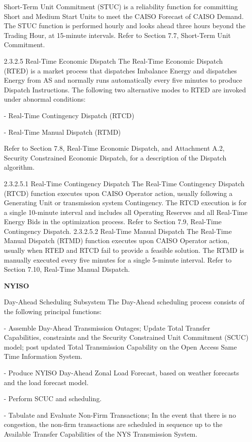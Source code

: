 \documentclass[11pt,a4paper]{article}
\begin{document}
Short-Term Unit Commitment (STUC) is a reliability function for committing Short and Medium Start Units to meet the CAISO Forecast of CAISO Demand. The STUC function is performed hourly and looks ahead three hours beyond the Trading Hour, at 15-minute intervals. Refer to Section 7.7, Short-Term Unit Commitment.

2.3.2.5 Real-Time Economic Dispatch
The Real-Time Economic Dispatch (RTED) is a market process that dispatches Imbalance Energy and dispatches Energy from AS and normally runs automatically every five minutes to
produce Dispatch Instructions. The following two alternative modes to RTED are invoked under abnormal conditions:

- Real-Time Contingency Dispatch (RTCD)

- Real-Time Manual Dispatch (RTMD)

Refer to Section 7.8, Real-Time Economic Dispatch, and Attachment A.2, Security Constrained Economic Dispatch, for a description of the Dispatch algorithm.

2.3.2.5.1 Real-Time Contingency Dispatch
The Real-Time Contingency Dispatch (RTCD) function executes upon CAISO Operator action, usually following a Generating Unit or transmission system Contingency. The RTCD execution is for a single 10-minute interval and includes all Operating Reserves and all Real-Time Energy Bids in the optimization process. Refer to Section 7.9, Real-Time Contingency Dispatch.
2.3.2.5.2 Real-Time Manual Dispatch
The Real-Time Manual Dispatch (RTMD) function executes upon CAISO Operator action, usually when RTED and RTCD fail to provide a feasible solution. The RTMD is manually executed every five minutes for a single 5-minute interval. Refer to Section 7.10, Real-Time Manual Dispatch.


\textbf{NYISO}

Day-Ahead Scheduling Subsystem
The Day-Ahead scheduling process consists of the following principal functions:

- Assemble Day-Ahead Transmission Outages; Update Total Transfer Capabilities, constraints and the Security Constrained Unit Commitment (SCUC) model; post updated Total Transmission Capability on the Open Access Same Time Information System.

- Produce NYISO Day-Ahead Zonal Load Forecast, based on weather forecasts and the load forecast model.

- Perform SCUC and scheduling.

- Tabulate and Evaluate Non-Firm Transactions; In the event that there is no congestion, the non-firm transactions are scheduled in sequence up to the Available Transfer Capabilities of the NYS Transmission System.
\end{document}
